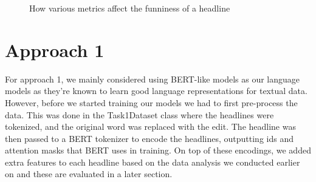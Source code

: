 \documentclass[11pt,a4paper]{article}
\begin{document}
\begin{figure}[htp]
\centering
{}\quad
{}\quad
{}
\caption{How various metrics affect the funniness of a headline}
\label{pics:data-analysis-metrics}
\end{figure}

\section{Approach 1}
For approach 1, we mainly considered using BERT-like models as our language models as they’re known to learn good language representations for textual data. However, before we started training our models we had to first pre-process the data. This was done in the Task1Dataset class where the headlines were tokenized, and the original word was replaced with the edit. The headline was then passed to a BERT tokenizer to encode the headlines, outputting ids and attention masks that BERT uses in training. On top of these encodings, we added extra features to each headline based on the data analysis we conducted earlier on and these are evaluated in a later section.
\end{document}
